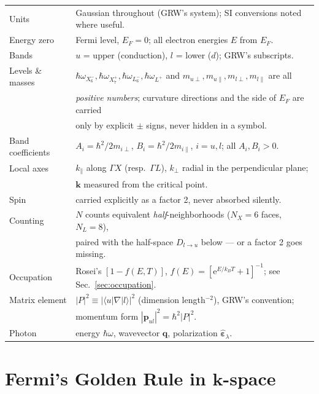 \documentclass[11pt,a4paper]{article}
\numberwithin{equation}{section}
\newcommand{\hw}{\hbar\omega}
\newcommand{\kperp}{k_{\perp}}
\newcommand{\kpar}{k_{\parallel}}
\newcommand{\pul}{\mathbf{p}_{ul}}
\newcommand{\eps}{\varepsilon}
\newcommand{\Dlu}{D_{l\to u}}
\newcommand{\wXu}{\hbar\omega_{X_6^-}}
\newcommand{\wXl}{\hbar\omega_{X_7^+}}
\newcommand{\wLu}{\hbar\omega_{L_6^-}}
\newcommand{\wLl}{\hbar\omega_{L^+}}
\newcommand{\fFD}{f}
\newcommand{\kB}{k_B}
\newcommand{\rme}{\mathrm{e}}
\begin{document}
\begin{center}
\begin{tabular}{ll}
\toprule
Units & Gaussian throughout (GRW's system); SI conversions noted where useful.\\
Energy zero & Fermi level, $E_F=0$; all electron energies $E$ from $E_F$.\\
Bands & $u$ = upper (conduction), $l$ = lower ($d$); GRW's subscripts.\\
Levels \& masses & $\wXu,\wXl,\wLu,\wLl$ and $m_{u\perp},m_{u\parallel},
                   m_{l\perp},m_{l\parallel}$ are all\\
                 & \emph{positive numbers}; curvature directions and the side
                   of $E_F$ are carried\\
                 & only by explicit $\pm$ signs, never hidden in a symbol.\\
Band coefficients & $A_i=\hbar^2/2m_{i\perp}$, $B_i=\hbar^2/2m_{i\parallel}$,
                    $i=u,l$; all $A_i,B_i>0$.\\
Local axes & $\kpar$ along $\Gamma X$ (resp.\ $\Gamma L$), $\kperp$ radial in
             the perpendicular plane;\\
           & $\mathbf{k}$ measured from the critical point.\\
Spin & carried explicitly as a factor 2, never absorbed silently.\\
Counting & $N$ counts equivalent \emph{half}-neighborhoods
           ($N_X=6$ faces, $N_L=8$),\\
         & paired with the half-space $\Dlu$ below --- or a factor 2 goes
           missing.\\
Occupation & Rosei's $[1-\fFD(E,T)]$, $\fFD(E)=[\rme^{E/\kB T}+1]^{-1}$;
             see Sec.~\ref{sec:occupation}.\\
Matrix element & $|P|^2\equiv|\langle u|\nabla|l\rangle|^2$
                 (dimension length$^{-2}$), GRW's convention;\\
               & momentum form $|\pul|^2=\hbar^2|P|^2$.\\
Photon & energy $\hw$, wavevector $\mathbf{q}$, polarization
         $\hat{\bm{\eps}}_\lambda$.\\
\bottomrule
\end{tabular}
\end{center}

\section{Fermi's Golden Rule in $\mathbf{k}$-space}\label{sec:fgr}
\end{document}
